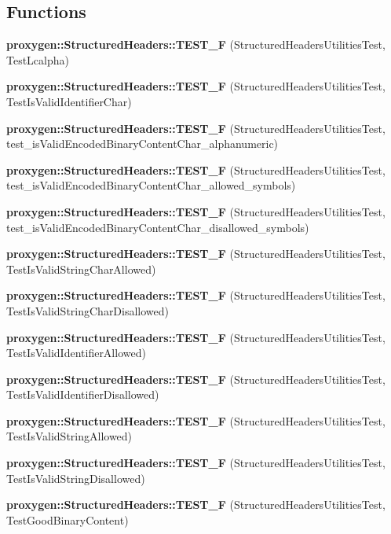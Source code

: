 \subsection*{Functions}
\begin{DoxyCompactItemize}
\item 
{\bf proxygen\+::\+Structured\+Headers\+::\+T\+E\+S\+T\+\_\+F} (Structured\+Headers\+Utilities\+Test, Test\+Lcalpha)
\item 
{\bf proxygen\+::\+Structured\+Headers\+::\+T\+E\+S\+T\+\_\+F} (Structured\+Headers\+Utilities\+Test, Test\+Is\+Valid\+Identifier\+Char)
\item 
{\bf proxygen\+::\+Structured\+Headers\+::\+T\+E\+S\+T\+\_\+F} (Structured\+Headers\+Utilities\+Test, test\+\_\+is\+Valid\+Encoded\+Binary\+Content\+Char\+\_\+alphanumeric)
\item 
{\bf proxygen\+::\+Structured\+Headers\+::\+T\+E\+S\+T\+\_\+F} (Structured\+Headers\+Utilities\+Test, test\+\_\+is\+Valid\+Encoded\+Binary\+Content\+Char\+\_\+allowed\+\_\+symbols)
\item 
{\bf proxygen\+::\+Structured\+Headers\+::\+T\+E\+S\+T\+\_\+F} (Structured\+Headers\+Utilities\+Test, test\+\_\+is\+Valid\+Encoded\+Binary\+Content\+Char\+\_\+disallowed\+\_\+symbols)
\item 
{\bf proxygen\+::\+Structured\+Headers\+::\+T\+E\+S\+T\+\_\+F} (Structured\+Headers\+Utilities\+Test, Test\+Is\+Valid\+String\+Char\+Allowed)
\item 
{\bf proxygen\+::\+Structured\+Headers\+::\+T\+E\+S\+T\+\_\+F} (Structured\+Headers\+Utilities\+Test, Test\+Is\+Valid\+String\+Char\+Disallowed)
\item 
{\bf proxygen\+::\+Structured\+Headers\+::\+T\+E\+S\+T\+\_\+F} (Structured\+Headers\+Utilities\+Test, Test\+Is\+Valid\+Identifier\+Allowed)
\item 
{\bf proxygen\+::\+Structured\+Headers\+::\+T\+E\+S\+T\+\_\+F} (Structured\+Headers\+Utilities\+Test, Test\+Is\+Valid\+Identifier\+Disallowed)
\item 
{\bf proxygen\+::\+Structured\+Headers\+::\+T\+E\+S\+T\+\_\+F} (Structured\+Headers\+Utilities\+Test, Test\+Is\+Valid\+String\+Allowed)
\item 
{\bf proxygen\+::\+Structured\+Headers\+::\+T\+E\+S\+T\+\_\+F} (Structured\+Headers\+Utilities\+Test, Test\+Is\+Valid\+String\+Disallowed)
\item 
{\bf proxygen\+::\+Structured\+Headers\+::\+T\+E\+S\+T\+\_\+F} (Structured\+Headers\+Utilities\+Test, Test\+Good\+Binary\+Content)
\item 

\end{DoxyCompactItemize}
